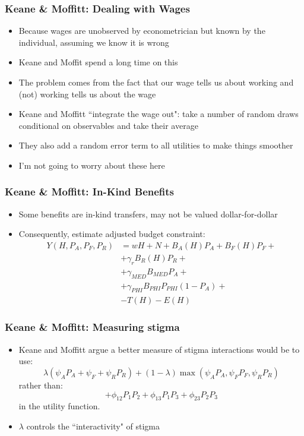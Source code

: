 \documentclass{beamer}
\begin{document}
\begin{frame}
\frametitle[alignment=center]{Keane \& Moffitt: Dealing with Wages}
\begin{itemize}
\item Because wages are unobserved by econometrician but known by the individual, assuming we know it is wrong
\bigskip
\item Keane and Moffit spend a long time on this
\bigskip
\item The problem comes from the fact that our wage tells us about working and (not) working tells us about the wage
\bigskip
\item Keane and Moffitt ``integrate the wage out": take a number of random draws conditional on observables and take their average
\bigskip
\item They also add a random error term to all utilities to make things smoother
\bigskip
\item I'm not going to worry about these here
\end{itemize}
\end{frame}

\begin{frame}
\frametitle[alignment=center]{Keane \& Moffitt: In-Kind Benefits}
\begin{itemize}
\item Some benefits are in-kind transfers, may not be valued dollar-for-dollar
\smallskip
\item Consequently, estimate adjusted budget constraint:
\begin{align*}
Y(H,P_A,P_F,P_R) & =wH+N+B_A(H)P_A+B_F(H)P_F+\\
 & +\gamma_rB_R(H)P_R+\\
 & + \gamma_{MED}B_{MED}P_A+ \\
 & +\gamma_{PHI}B_{PHI}P_{PHI}(1-P_A)+\\
  & -T(H)-E(H)
 \end{align*}
\end{itemize}
\end{frame}

\begin{frame}
\frametitle[alignment=center]{Keane \& Moffitt: Measuring stigma}
\begin{itemize}
\item Keane and Moffitt argue a better measure of stigma interactions would be to use:
$$\lambda(\psi_AP_A+\psi_F+\psi_RP_R)+(1-\lambda)\max\left(\psi_AP_A,\psi_FP_F,\psi_RP_R\right)$$
rather than:
$$ + \phi_{12}P_1P_2 + \phi_{13}P_1P_3+\phi_{23}P_2P_3 $$
in the utility function.
\item $\lambda$ controls the ``interactivity" of stigma
\end{itemize}
\end{frame}
\end{document}
